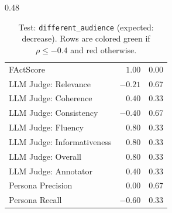 \begin{table}[htbp]
\begin{subtable}[t]{0.48\textwidth}
\begin{tabular}{lrr}
\midrule
\rowcolor{matchFalse} FActScore                             &   $1.00$ &  0.00 \\
\rowcolor{matchFalse} LLM Judge: Relevance                  &  $-0.21$ &  0.67 \\
\rowcolor{matchFalse} LLM Judge: Coherence                  &   $0.40$ &  0.33 \\
\rowcolor{matchTrue} LLM Judge: Consistency                &  $-0.40$ &  0.67 \\
\rowcolor{matchFalse} LLM Judge: Fluency                    &   $0.80$ &  0.33 \\
\rowcolor{matchFalse} LLM Judge: Informativeness            &   $0.80$ &  0.33 \\
\rowcolor{matchFalse} LLM Judge: Overall                    &   $0.80$ &  0.33 \\
\rowcolor{matchFalse} LLM Judge: Annotator        &   $0.40$ &  0.33 \\
\rowcolor{matchFalse} Persona Precision                     &   $0.00$ &  0.67 \\
\rowcolor{matchTrue} Persona Recall                        &  $-0.60$ &  0.33 \\
\bottomrule
\end{tabular}
\caption{LLM metrics}
\end{subtable}
\caption{Test: \texttt{different\_audience} (expected: decrease). Rows are colored green if $\rho\leq-0.4$ and red otherwise.}
\label{tab:different_audience}
\end{table}


